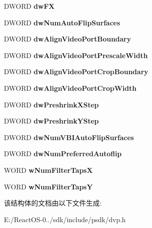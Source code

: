 \begin{DoxyCompactItemize}
D\+W\+O\+RD {\bfseries dw\+FX}
\item 
\mbox{\label{struct___d_d_v_i_d_e_o_p_o_r_t_c_a_p_s_ac5c8675f3f0fea309cd5351788447489}} 
D\+W\+O\+RD {\bfseries dw\+Num\+Auto\+Flip\+Surfaces}
\item 
\mbox{\label{struct___d_d_v_i_d_e_o_p_o_r_t_c_a_p_s_a28b6c2df1147a2076069dc70964ddb48}} 
D\+W\+O\+RD {\bfseries dw\+Align\+Video\+Port\+Boundary}
\item 
\mbox{\label{struct___d_d_v_i_d_e_o_p_o_r_t_c_a_p_s_ac44129274a96046c40221b0ef507ea6e}} 
D\+W\+O\+RD {\bfseries dw\+Align\+Video\+Port\+Prescale\+Width}
\item 
\mbox{\label{struct___d_d_v_i_d_e_o_p_o_r_t_c_a_p_s_a053bdafc126761ffca12475f012bfb18}} 
D\+W\+O\+RD {\bfseries dw\+Align\+Video\+Port\+Crop\+Boundary}
\item 
\mbox{\label{struct___d_d_v_i_d_e_o_p_o_r_t_c_a_p_s_afb7ad30208c99f40fdd0d4062e6bd9c6}} 
D\+W\+O\+RD {\bfseries dw\+Align\+Video\+Port\+Crop\+Width}
\item 
\mbox{\label{struct___d_d_v_i_d_e_o_p_o_r_t_c_a_p_s_a6c7581e6af6b7518810fd14b80ab7123}} 
D\+W\+O\+RD {\bfseries dw\+Preshrink\+X\+Step}
\item 
\mbox{\label{struct___d_d_v_i_d_e_o_p_o_r_t_c_a_p_s_a08b032317a2903d8937464611f4c219b}} 
D\+W\+O\+RD {\bfseries dw\+Preshrink\+Y\+Step}
\item 
\mbox{\label{struct___d_d_v_i_d_e_o_p_o_r_t_c_a_p_s_a78d227b45db367becb41ed523866000a}} 
D\+W\+O\+RD {\bfseries dw\+Num\+V\+B\+I\+Auto\+Flip\+Surfaces}
\item 
\mbox{\label{struct___d_d_v_i_d_e_o_p_o_r_t_c_a_p_s_a3d91ed457d28a169c33f1d9aad15df32}} 
D\+W\+O\+RD {\bfseries dw\+Num\+Preferred\+Autoflip}
\item 
\mbox{\label{struct___d_d_v_i_d_e_o_p_o_r_t_c_a_p_s_acbe1c33a6346cd37635af1771f31ff5b}} 
W\+O\+RD {\bfseries w\+Num\+Filter\+TapsX}
\item 
\mbox{\label{struct___d_d_v_i_d_e_o_p_o_r_t_c_a_p_s_a4c4032b29079b99783d1cfdc44e93c6b}} 
W\+O\+RD {\bfseries w\+Num\+Filter\+TapsY}
\end{DoxyCompactItemize}


该结构体的文档由以下文件生成\+:\begin{DoxyCompactItemize}
\item 
E\+:/\+React\+O\+S-\/0../sdk/include/psdk/dvp.\+h\end{DoxyCompactItemize}
